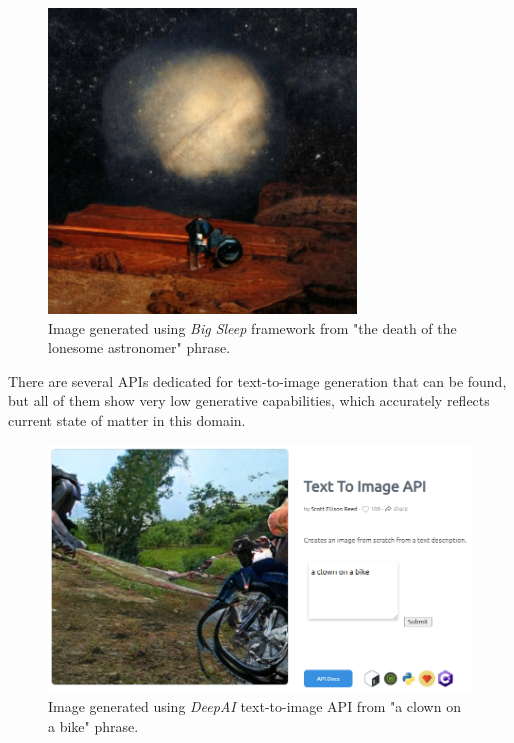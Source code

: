 \documentclass[12pt,a4paper,openany]{book}
\begin{document}

\begin{figure}[H]
    \centering
    \includegraphics[scale=1.0]{figs/bigsleep.png}
    \caption{Image generated using \textit{Big Sleep} \cite{bigsleep} framework from "the death of the lonesome astronomer" phrase.}\label{Fig:BigSleep}
\end{figure}


\noindent There are several APIs dedicated for text-to-image generation that can be found, but all of them show very low generative capabilities, which accurately reflects current state of matter in this domain.

\begin{figure}[H]
    \centering
    \includegraphics[scale=0.6]{figs/deepai.png}
    \caption{Image generated using \textit{DeepAI} \cite{deepai} text-to-image API from "a clown on a bike" phrase.}\label{Fig:deepai}
\end{figure}
\end{document}
